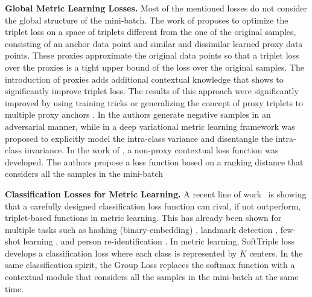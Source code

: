 \documentclass{article}
\begin{document}
\textbf{Global Metric Learning Losses.} Most of the mentioned losses do not consider the global structure of the mini-batch. 
The work of \cite{DBLP:conf/iccv/Movshovitz-Attias17} proposes to optimize the triplet loss on a space of triplets different from the one of the original samples, consisting of an anchor data point and similar and dissimilar learned proxy data points. 
These proxies approximate the original data points so that a triplet loss over the proxies is a tight upper bound of the loss over the original samples. 
The introduction of proxies adds additional contextual knowledge that shows to significantly improve triplet loss. The results of this approach were significantly improved by using training tricks \cite{DBLP:journals/corr/abs-2004-01113} or generalizing the concept of proxy triplets to multiple proxy anchors \cite{DBLP:conf/cvpr/KimKCK20, DBLP:journals/corr/abs-2010-13636}. 
In \cite{DBLP:conf/cvpr/DuanZLL018} the authors generate negative samples in an adversarial manner, while in \cite{DBLP:conf/eccv/LinDDLZ18} a deep variational metric learning framework was proposed to explicitly model the intra-class variance and disentangle the intra-class invariance.
In the work of \cite{DBLP:conf/cvpr/WangHKHGR19}, a non-proxy contextual loss function was developed. The authors propose a loss function based on a ranking distance that considers all the samples in the mini-batch 


\textbf{Classification Losses for Metric Learning.} A recent line of work~\cite{DBLP:journals/corr/abs-1811-12649, DBLP:conf/aaai/ZhengJSZWH19} is showing that a carefully designed classification loss function can rival, if not outperform, triplet-based functions in metric learning. This has already been shown for multiple tasks such as hashing (binary-embedding) \cite{DBLP:conf/cvpr/0003CBS18}, landmark detection \cite{DBLP:conf/cvpr/0003LS18, DBLP:journals/corr/abs-1906-07589}, few-shot learning \cite{DBLP:conf/cvpr/Cakir0XKS19}, and person re-identification \cite{DBLP:journals/corr/abs-1904-11397,DBLP:conf/cvpr/ZhaoXC19}. In metric learning, SoftTriple loss \cite{DBLP:journals/corr/abs-1909-05235} develops a classification loss where each class is represented by $K$ centers. In the same classification spirit, the Group Loss \cite{DBLP:conf/eccv/GrLoss} replaces the softmax function with a contextual module that considers all the samples in the mini-batch at the same time.  
\end{document}
